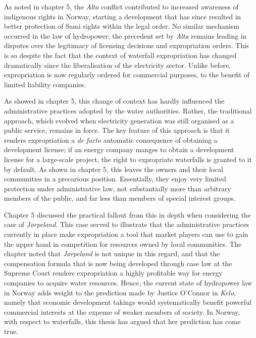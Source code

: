 As noted in chapter 5, the {\it Alta} conflict contributed to increased awareness of indigenous rights in Norway, starting a development that has since resulted in better protection of Sami rights within the legal order. No similar mechanism occurred in the law of hydropower; the precedent set by {\it Alta} remains leading in disputes over the legitimacy of licensing decisions and expropriation orders. This is so despite the fact that the context of waterfall expropriation has changed dramatically since the liberalisation of the electricity sector. Unlike before, expropriation is now regularly ordered for commercial purposes, to the benefit of limited liability companies.%

As showed in chapter 5, this change of context has hardly influenced the administrative practices adopted by the water authorities. Rather, the traditional approach, which evolved when electricity generation was still organised as a public service, remains in force. The key feature of this approach is that it renders expropriation a {\it de facto} automatic consequence of obtaining a development license; if an energy company manges to obtain a development license for a large-scale project, the right to expropriate waterfalls is granted to it by default. As shown in chapter 5, this leaves the owners and their local communities in a precarious position. Essentially, they enjoy very limited protection under administrative law, not substantially more than arbitrary members of the public, and far less than members of special interest groups.


Chapter 5 discussed the practical fallout from this in depth when considering the case of {\it Jørpeland}. This case served to illustrate that the administrative practices currently in place make expropriation a tool that market players can use to gain the upper hand in competition for resources owned by local communities. The chapter noted that {\it Jørpeland} is not unique in this regard, and that the compensation formula that is now being developed through case law at the Supreme Court renders expropriation a highly profitable way for energy companies to acquire water resources. Hence, the current state of hydropower law in Norway adds weight to the prediction made by Justice O'Connor in {\it Kelo}, namely that economic development takings would systematically benefit powerful commercial interests at the expense of weaker members of society. In Norway, with respect to waterfalls, this thesis has argued that her prediction has come true.


